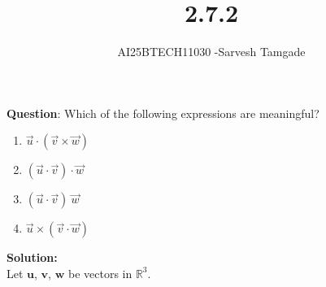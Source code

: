 \documentclass[journal]{IEEEtran}
\begin{document}

\vspace{3cm}

\title{2.7.2}
\author{AI25BTECH11030 -Sarvesh Tamgade}
{\let\newpage\relax\maketitle}

\renewcommand{\thefigure}{\theenumi}
\renewcommand{\thetable}{\theenumi}
\setlength{\intextsep}{10pt} 


\renewcommand{\thetable}{\theenumi}


\textbf{Question}:  Which of the following expressions are meaningful?
\begin{multicols}{2}
\begin{enumerate}[label=(\alph*)]
     
\item $\vec{u} \cdot (\vec{v} \times \vec{w})$
\item $(\vec{u} \cdot \vec{v}) \cdot \vec{w}$
\item $(\vec{u} \cdot \vec{v})\ \vec{w}$
\item $\vec{u} \times (\vec{v} \cdot \vec{w})$

\end{enumerate}
\end{multicols}

\textbf{Solution:}\\
Let $\mathbf{u}$, $\mathbf{v}$, $\mathbf{w}$ be vectors in $\mathbb{R}^3$.
\end{document}
